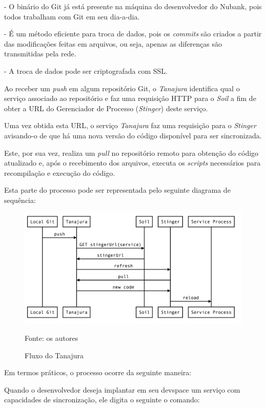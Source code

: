 \documentclass[twosideprint]{politex}
\newcommand{\legend}[1]{\begin{center}\def\caption{}\caption{#1}\end{center}}
\begin{document}
	- O binário do Git já está presente na máquina do desenvolvedor do Nubank, pois todos trabalham com Git em seu dia-a-dia.
	
	- É um método eficiente para troca de dados, pois os \textit{commits} são criados a partir das modificações feitas em arquivos, ou seja, apenas as diferenças são transmitidas pela rede.
	
	- A troca de dados pode ser criptografada com SSL.

	Ao receber um \textit{push} em algum repositório Git, o \textit{Tanajura} identifica qual o serviço associado ao repositório e faz uma requisição HTTP para o \textit{Soil} a fim de obter a URL do Gerenciador de Processo (\textit{Stinger}) deste serviço.
	
	Uma vez obtida esta URL, o serviço \textit{Tanajura} faz uma requisição para o \textit{Stinger} avisando-o de que há uma nova versão do código disponível para ser sincronizada.
	
	Este, por sua vez, realiza um \textit{pull} no repositório remoto para obtenção do código atualizado e, após o recebimento dos arquivos, executa os \textit{scripts} necessários para recompilação e execução do código.
	
	Esta parte do processo pode ser representada pelo seguinte diagrama de sequência:
		\begin{figure}[htb]
			\caption{\label{fig_arquitetura2}Fluxo do Tanajura}
			\begin{center}
			\includegraphics[scale=0.30]{pictures/tanajura-flow.png}
			\end{center}
			\legend{Fonte: os autores}
		\end{figure}

	Em termos práticos, o processo ocorre da seguinte maneira:
	
	Quando o desenvolvedor deseja implantar em seu devspace um serviço com capacidades de sincronização, ele digita o seguinte o comando:
\end{document}
